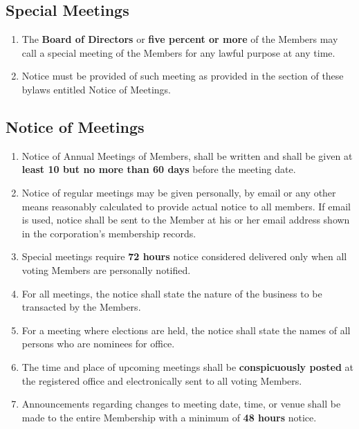 \documentclass{article}
\begin{document}
\subsection{Special Meetings}
\begin{enumerate}
    \item The \textbf{Board of Directors} or \textbf{five percent or more} of the Members may call a special meeting of the Members for any lawful purpose at any time.
    \item Notice must be provided of such meeting as provided in the section of these bylaws entitled Notice of Meetings.
\end{enumerate}
\subsection{Notice of Meetings}
\begin{enumerate}
    \item Notice of Annual Meetings of Members, shall be written and shall be
    given at \textbf{least 10 but no more than 60 days} before the meeting date.
    \item Notice of regular meetings may be given personally, by email or any
    other means reasonably calculated to provide actual notice to all members.
    If email is used, notice shall be sent to the Member at his or her email
    address shown in the corporation’s membership records.
    \item Special meetings require \textbf{72 hours} notice considered delivered only
    when all voting Members are personally notified.
    \item For all meetings, the notice shall state the nature of the business to
    be transacted by the Members.
    \item For a meeting where elections are held, the notice shall state the
    names of all persons who are nominees for office.
    \item The time and place of upcoming meetings shall be \textbf{conspicuously posted}
    at the registered office and electronically sent to all voting Members.
    \item Announcements regarding changes to meeting date, time, or venue shall
    be made to the entire Membership with a minimum of \textbf{48 hours} notice.
\end{enumerate}
\end{document}
